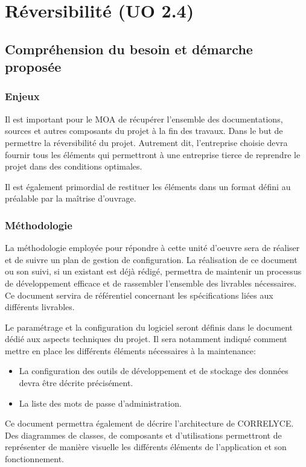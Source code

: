 	\section{Réversibilité (UO 2.4)}
	\subsection{Compréhension du besoin et démarche proposée}
	\subsubsection{Enjeux}
	Il est important pour le MOA de récupérer l’ensemble des documentations, sources et autres composants du projet à la fin des travaux. Dans le but de permettre la réversibilité du projet. Autrement dit, l’entreprise choisie devra fournir tous les éléments qui permettront à une entreprise tierce de reprendre le projet dans des conditions optimales. 
	
	Il est également primordial de restituer les éléments dans un format défini au préalable par la maîtrise d’ouvrage.
	
	\subsubsection{Méthodologie}
	La méthodologie employée pour répondre à cette unité d’oeuvre sera de réaliser et de suivre un plan de gestion de configuration. La réalisation de ce document ou son suivi, si un existant est déjà rédigé, permettra de maintenir un processus de développement efficace et de rassembler l’ensemble des livrables nécessaires. Ce document servira de référentiel concernant les spécifications liées aux différents livrables.
	
	Le paramétrage et la configuration du logiciel seront définis dans le document dédié aux aspects techniques du projet. Il sera notamment indiqué comment mettre en place les différents éléments nécessaires à la maintenance:
	
	\begin{itemize}
		\item La configuration des outils de développement et de stockage des données devra être décrite précisément. 
		\item La liste des mots de passe d’administration.
	\end{itemize}
	
	Ce document permettra également de décrire l’architecture de CORRELYCE. Des diagrammes de classes, de composants et d’utilisations permettront de représenter de manière visuelle les différents éléments de l’application et son fonctionnement.
	
